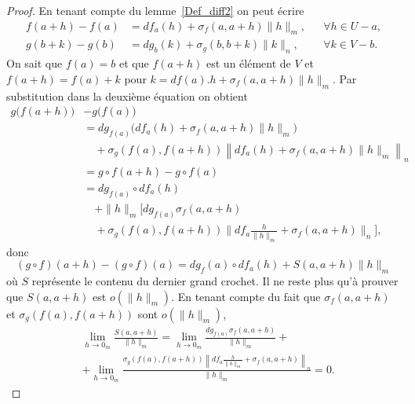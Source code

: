 \begin{proof}
	En tenant compte du lemme~\ref{Def_diff2} on peut écrire
	\begin{subequations}
		\begin{align}
			f(a+h)-f(a) & =df_a(h)+\sigma_f(a,a+h)\|h\|_m, &  & \forall h\in U-a, \\
			g(b+k)-g(b) & =dg_b(k)+\sigma_g(b,b+k)\|k\|_n, &  & \forall k\in V-b.
		\end{align}
	\end{subequations}
	On sait que $f(a)=b$ et que $f(a+h)$ est  un élément de $V$ et $f(a+h)=f(a)+k$ pour $k=df(a).h+\sigma_f(a,a+h)\|h\|_m$.  Par substitution dans la deuxième équation on obtient
	\begin{equation}
		\begin{aligned}
			g\big(f(a+h)\big) & - g\big(f(a)\big)                                                                                  \\
			                  & =dg_{f(a)}\Big(df_a(h)+\sigma_f(a,a+h)\|h\|_m\Big)                                                 \\
			                  & \quad+\sigma_g\left(f(a), f(a+h)\right)\left\| df_a(h)+\sigma_f(a,a+h)\|h\|_m\right \|_n           \\
			                  & =g\circ f (a+h) - g\circ f (a)                                                                     \\
			                  & = dg_{f(a)}\circ df_a(h)                                                                           \\
			                  & \quad +\|h\|_m\Big[ dg_{f(a)}\sigma_f(a,a+h)                                                       \\
			                  & \quad+\sigma_g\left(f(a), f(a+h)\right)\big\| df_a\frac{h}{\|h\|_m}+\sigma_f(a,a+h)\big \|_n\Big],
		\end{aligned}
	\end{equation}
	donc
	\begin{equation}
		(g\circ f) (a+h) - (g\circ f) (a) = dg_f(a)\circ df_a(h) + S(a,a+h) \|h\|_m
	\end{equation}
	où $S$ représente le contenu du dernier grand crochet. Il ne reste plus qu'à prouver que $S(a,a+h)$ est $o(\|h\|_m)$. En tenant compte du fait que $\sigma_f(a,a+h)$ et $\sigma_g\left(f(a), f(a+h)\right)$ sont $o (\|h\|_m)$,
	\begin{equation}
		\begin{aligned}
			 & \lim_{h\to 0_m} \frac{S(a,a+h)}{\|h\|_m}= \lim_{h\to 0_m}\frac{dg_{f(a)}\sigma_f(a,a+h)}{\|h\|_m}+                              \\
			 & + \lim_{h\to 0_m}\frac{\sigma_g\left(f(a), f(a+h)\right)\left\| df_a\frac{h}{\|h\|_m}+\sigma_f(a,a+h)\right \|_n}{\|h\|_m} = 0.
		\end{aligned}
	\end{equation}
\end{proof}

